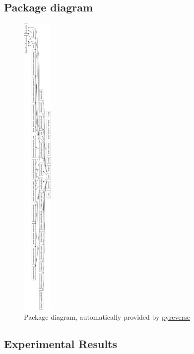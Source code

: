 \subsection*{Package diagram}
  \begin{figure}[H]
   \includegraphics[width=0.13\textwidth]{../Images/packagediagram.png}
   \centering
   \caption{Package diagram, automatically provided by \href{https://pypi.org/project/pyreverse/}{pyreverse}}
   \label{fig:tree}
  \end{figure}\noindent
 \subsection*{Experimental Results}
